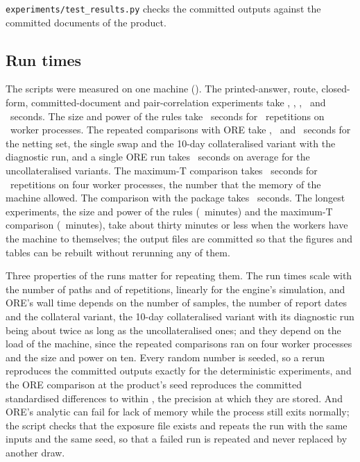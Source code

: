 \texttt{experiments/test\_results.py} checks the committed outputs against the committed documents of the product.

\subsection{Run times}
\label{sec:repro-times}

The scripts were measured on one machine (\nHardware). The printed-answer, route, closed-form, committed-document and pair-correlation experiments take \nTimePrinted, \nTimeRoutes, \nTimeClosed, \nTimeCommitted\ and \nTimePairs\ seconds. The size and power of the rules take \nTimeCriterion\ seconds for \nCritReps\ repetitions on \nWorkers\ worker processes. The repeated comparisons with ORE take \nTimeOreNet, \nTimeOreSingle\ and \nTimeOreCsa\ seconds for the netting set, the single swap and the 10-day collateralised variant with the diagnostic run, and a single ORE run takes \nOreSecondsMean\ seconds on average for the uncollateralised variants. The maximum-T comparison takes \nTimeMaxt\ seconds for \nMaxtReps\ repetitions on four worker processes, the number that the memory of the machine allowed. The comparison with the package takes \nTimeTM\ seconds. The longest experiments, the size and power of the rules (\nTimeCriterionMin\ minutes) and the maximum-T comparison (\nTimeMaxtMin\ minutes), take about thirty minutes or less when the workers have the machine to themselves; the output files are committed so that the figures and tables can be rebuilt without rerunning any of them.

Three properties of the runs matter for repeating them. The run times scale with the number of paths and of repetitions, linearly for the engine's simulation, and ORE's wall time depends on the number of samples, the number of report dates and the collateral variant, the 10-day collateralised variant with its diagnostic run being about twice as long as the uncollateralised ones; and they depend on the load of the machine, since the repeated comparisons ran on four worker processes and the size and power on ten. Every random number is seeded, so a rerun reproduces the committed outputs exactly for the deterministic experiments, and the ORE comparison at the product's seed reproduces the committed standardised differences to within \nSeedFortyTwoGap, the precision at which they are stored. And ORE's analytic can fail for lack of memory while the process still exits normally; the script checks that the exposure file exists and repeats the run with the same inputs and the same seed, so that a failed run is repeated and never replaced by another draw.
